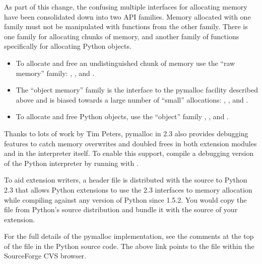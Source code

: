 \documentclass{howto}
\begin{document}
As part of this change, the confusing multiple interfaces for
allocating memory have been consolidated down into two API families.
Memory allocated with one family must not be manipulated with
functions from the other family.  There is one family for allocating
chunks of memory, and another family of functions specifically for
allocating Python objects.

\begin{itemize}
  \item To allocate and free an undistinguished chunk of memory use
  the ``raw memory'' family: ,
  , and .

  \item The ``object memory'' family is the interface to the pymalloc
  facility described above and is biased towards a large number of
  ``small'' allocations: ,
  , and .

  \item To allocate and free Python objects, use the ``object'' family
  , , and
  .
\end{itemize}

Thanks to lots of work by Tim Peters, pymalloc in 2.3 also provides
debugging features to catch memory overwrites and doubled frees in
both extension modules and in the interpreter itself.  To enable this
support, compile a debugging version of the Python interpreter by
running  with .

To aid extension writers, a header file  is
distributed with the source to Python 2.3 that allows Python
extensions to use the 2.3 interfaces to memory allocation while
compiling against any version of Python since 1.5.2.  You would copy
the file from Python's source distribution and bundle it with the
source of your extension.

\begin{seealso}

{For the full details of the pymalloc implementation, see
the comments at the top of the file  in the
Python source code.  The above link points to the file within the
SourceForge CVS browser.}

\end{seealso}
\end{document}
